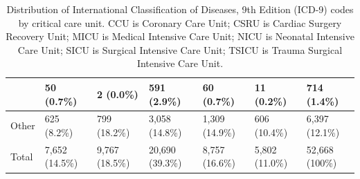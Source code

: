 \documentclass[english]{article}
\begin{document}
\begin{center}
\begin{table}
\begin{tabular}{|p{4.2cm}|p{1.3cm}|p{1.3cm}|p{1.3cm}|p{1.3cm}|p{1.3cm}|p{1.3cm}|}
    & 50 (0.7\%) & 2 (0.0\%) & 591 (2.9\%) & 60 (0.7\%) & 11 (0.2\%) & 714 (1.4\%) \\ 
    \hline
    Other & 625 (8.2\%) & 799 (18.2\%) & 3,058 (14.8\%) & 1,309 (14.9\%) & 606 (10.4\%) & 6,397 (12.1\%) \\ 
    \hline
    Total & 7,652 (14.5\%) & 9,767 (18.5\%) & 20,690 (39.3\%) & 8,757 (16.6\%) & 5,802 (11.0\%) & 52,668 (100\%) \\ 
    \hline
\end{tabular}
\caption{Distribution of International Classification of Diseases, 9th Edition (ICD-9) codes by critical care unit. CCU is Coronary Care Unit; CSRU is Cardiac Surgery Recovery Unit; MICU is Medical Intensive Care Unit; NICU is Neonatal Intensive Care Unit; SICU is Surgical Intensive Care Unit; TSICU is Trauma Surgical Intensive Care Unit.}
\label{table:icddistribution}
\end{table}
\end{center}

\end{document}
